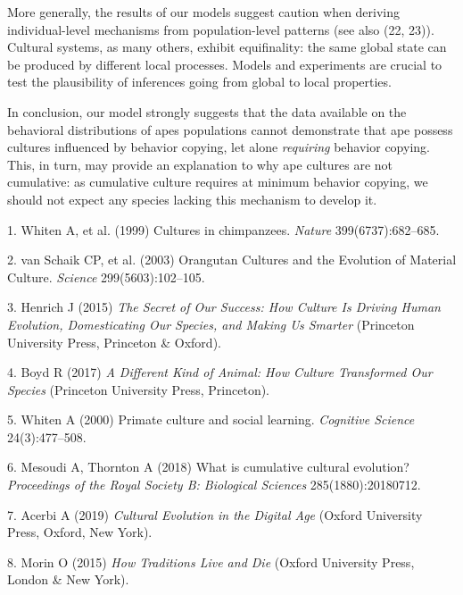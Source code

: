 \documentclass[9pt,twocolumn,twoside,]{pnas-new}
\begin{document}
More generally, the results of our models suggest caution when deriving
individual-level mechanisms from population-level patterns (see also
(22, 23)). Cultural systems, as many others, exhibit equifinality: the
same global state can be produced by different local processes. Models
and experiments are crucial to test the plausibility of inferences going
from global to local properties.

In conclusion, our model strongly suggests that the data available on
the behavioral distributions of apes populations cannot demonstrate that
ape possess cultures influenced by behavior copying, let alone
\emph{requiring} behavior copying. This, in turn, may provide an
explanation to why ape cultures are not cumulative: as cumulative
culture requires at minimum behavior copying, we should not expect any
species lacking this mechanism to develop it.

\showmatmethods
\showacknow
\pnasbreak

\hypertarget{refs}{}
\hypertarget{ref-whiten_cultures_1999}{}
1. Whiten A, et al. (1999) Cultures in chimpanzees. \emph{Nature}
399(6737):682--685.

\hypertarget{ref-van_schaik_orangutan_2003}{}
2. van Schaik CP, et al. (2003) Orangutan Cultures and the Evolution of
Material Culture. \emph{Science} 299(5603):102--105.

\hypertarget{ref-henrich_secret_2015}{}
3. Henrich J (2015) \emph{The Secret of Our Success: How Culture Is
Driving Human Evolution, Domesticating Our Species, and Making Us
Smarter} (Princeton University Press, Princeton \& Oxford).

\hypertarget{ref-boyd_different_2017}{}
4. Boyd R (2017) \emph{A Different Kind of Animal: How Culture
Transformed Our Species} (Princeton University Press, Princeton).

\hypertarget{ref-whiten_primate_2000}{}
5. Whiten A (2000) Primate culture and social learning. \emph{Cognitive
Science} 24(3):477--508.

\hypertarget{ref-mesoudi_what_2018}{}
6. Mesoudi A, Thornton A (2018) What is cumulative cultural evolution?
\emph{Proceedings of the Royal Society B: Biological Sciences}
285(1880):20180712.

\hypertarget{ref-acerbi_cultural_2019}{}
7. Acerbi A (2019) \emph{Cultural Evolution in the Digital Age} (Oxford
University Press, Oxford, New York).

\hypertarget{ref-morin_how_2015}{}
8. Morin O (2015) \emph{How Traditions Live and Die} (Oxford University
Press, London \& New York).
\end{document}
